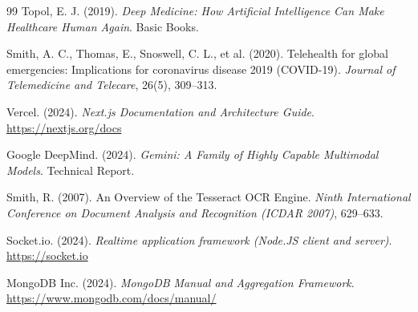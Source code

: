 \documentclass[12pt,a4paper]{report}
\begin{document}
\begin{thebibliography}{99}
Topol, E. J. (2019). \textit{Deep Medicine: How Artificial Intelligence Can Make Healthcare Human Again}. Basic Books.

Smith, A. C., Thomas, E., Snoswell, C. L., et al. (2020). Telehealth for global emergencies: Implications for coronavirus disease 2019 (COVID-19). \textit{Journal of Telemedicine and Telecare}, 26(5), 309--313.

Vercel. (2024). \textit{Next.js Documentation and Architecture Guide}. \url{https://nextjs.org/docs}

Google DeepMind. (2024). \textit{Gemini: A Family of Highly Capable Multimodal Models}. Technical Report.

Smith, R. (2007). An Overview of the Tesseract OCR Engine. \textit{Ninth International Conference on Document Analysis and Recognition (ICDAR 2007)}, 629--633.

Socket.io. (2024). \textit{Realtime application framework (Node.JS client and server)}. \url{https://socket.io}

MongoDB Inc. (2024). \textit{MongoDB Manual and Aggregation Framework}. \url{https://www.mongodb.com/docs/manual/}

\end{thebibliography}
\end{document}

